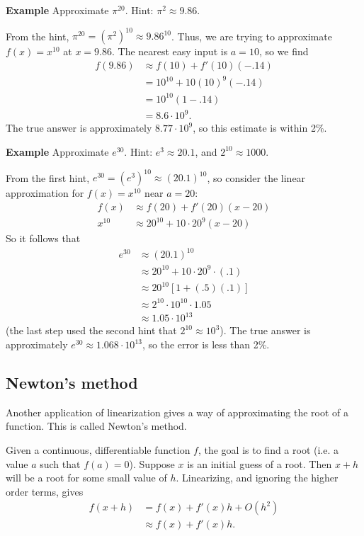 \documentclass[twoside,openright,titlepage,a4paper]{book}
\begin{document}
\begin{sloppypar}
\textbf{Example} Approximate $\pi^{20}$. Hint: $\pi^2 \approx 9.86$.
\begin{examplebox}
From the hint, $\pi^{20} = (\pi^2)^{10} \approx 9.86^{10}$. Thus, we are trying to approximate $f(x) = x^{10}$ at $x = 9.86$. The nearest easy input is $a = 10$, so we find
\begin{align*}
f(9.86) &\approx f(10) + f'(10)(-.14) \\
&= 10^{10} + 10 (10)^9 (-.14) \\
&= 10^{10} \left(1-.14 \right) \\
&= 8.6 \cdot 10^9.
\end{align*}
The true answer is approximately $8.77 \cdot 10^9$, so this estimate is within 2\%.
\end{examplebox}
	
\textbf{Example} Approximate $e^{30}$. Hint: $e^{3} \approx 20.1$, and $2^{10} \approx 1000$.
\begin{examplebox}
From the first hint, $e^{30} = (e^3)^{10} \approx (20.1)^{10}$, so consider the linear approximation for $f(x) = x^{10}$ near $a=20$:
\begin{align*}
f(x) & \approx f(20) + f'(20)(x-20) \\
x^{10} &\approx 20^{10} + 10 \cdot 20^9 (x-20) 
\end{align*}
So it follows that
\begin{align*} 
e^{30} & \approx (20.1)^{10} \\
& \approx 20^{10} + 10 \cdot 20^9 \cdot (.1) \\
& \approx 20^{10}\left[1+(.5)(.1)\right] \\
& \approx 2^{10} \cdot 10^{10} \cdot 1.05 \\
& \approx 1.05 \cdot 10^{13}
\end{align*}
(the last step used the second hint that $2^{10} \approx 10^3$). The true answer is approximately $e^{30} \approx 1.068 \cdot 10^{13}$, so the error is less than 2\%.	
\end{examplebox}
		
\subsection{Newton's method}

Another application of linearization gives a way of approximating the root of a function. This is called Newton's method.

Given a continuous, differentiable function $f$, the goal is to find a root (i.e. a value $a$ such that $f(a)=0$). Suppose $x$ is an initial guess of a root. Then $x+h$ will be a root for some small value of $h$. Linearizing, and ignoring the higher order terms, gives
\begin{align*}
f(x+h) &= f(x) + f'(x)h + O(h^2) \\
&\approx f(x) + f'(x)h. 
\end{align*}


\end{sloppypar}
\end{document}
